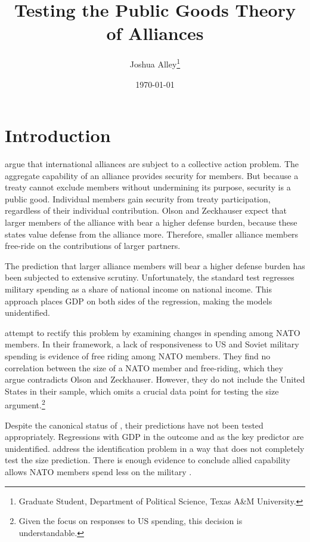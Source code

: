 \documentclass[12pt]{article}
\title{
\textbf{Testing the Public Goods Theory of Alliances}
	}
\author{Joshua Alley\footnote{Graduate Student,
Department of Political Science, Texas A\&M University.}}
\date{{\normalsize \today}}
\begin{document}
\maketitle 

\doublespace



\section{Introduction}


\citet{OlsonZeckhauser1966} argue that international alliances are subject to a collective action problem. 
The aggregate capability of an alliance provides security for members. 
But because a treaty cannot exclude members without undermining its purpose, security is a public good. 
Individual members gain security from treaty participation, regardless of their individual contribution. 
Olson and Zeckhauser expect that larger members of the alliance with bear a higher defense burden, because these states value defense from the alliance more. 
Therefore, smaller alliance members free-ride on the contributions of larger partners. 


The prediction that larger alliance members will bear a higher defense burden has been subjected to extensive scrutiny. 
Unfortunately, the standard test regresses military spending as a share of national income on national income. 
This approach places GDP on both sides of the regression, making the models unidentified. 


\citet{PluemperNeumayer2015} attempt to rectify this problem by examining changes in spending among NATO members. 
In their framework, a lack of responsiveness to US and Soviet military spending is evidence of free riding among NATO members.
They find no correlation between the size of a NATO member and free-riding, which they argue contradicts Olson and Zeckhauser. 
However, they do not include the United States in their sample, which omits a crucial data point for testing the size argument.\footnote{Given the focus on responses to US spending, this decision is understandable.}


Despite the canonical status of \citet{OlsonZeckhauser1966}, their predictions have not been tested appropriately. 
Regressions with GDP in the outcome and as the key predictor are unidentified. 
\citet{PluemperNeumayer2015} address the identification problem in a way that does not completely test the size prediction. 
There is enough evidence to conclude allied capability allows NATO members spend less on the military \citep{PluemperNeumayer2015, GeorgeSandler2017}.
\end{document}
